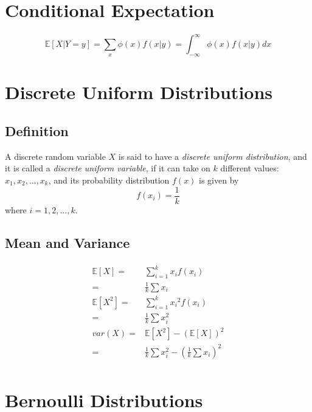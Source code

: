 \documentclass[titlepage]{article}
\begin{document}
    \section{Conditional Expectation}
        \paragraph{
            $$\mathbb{E}[X|Y=y]=\sum_x\phi(x)f(x|y)=\int_{-\infty}^\infty \phi(x)f(x|y)dx$$
        }
    \section{Discrete Uniform Distributions}
        \subsection*{Definition}
            A discrete random variable $X$ is said to have a \textit{discrete uniform distribution}, and it is called a \textit{discrete uniform variable}, if it can take on $k$ different values: $x_1,x_2,...,x_k$, and its probability distribution $f(x)$ is given by
            $$f(x_i)=\frac{1}{k}$$
            where $i=1,2,...,k$.

        \subsection*{Mean and Variance}
            \paragraph{
                \begin{equation*}
                    \begin{split}
                        \mathbb{E}[X]=&\sum_{i=1}^k x_if(x_i)\\
                        =&\frac{1}{k}\sum x_i\\
                        \mathbb{E}[X^2]=&\sum_{i=1}^k {x_i}^2f(x_i)\\
                        =&\frac{1}{k}\sum x_i^2\\
                        var(X)=&\mathbb{E}[X^2]-(\mathbb{E}[X])^2\\
                        =&\frac{1}{k}\sum x_i^2-(\frac{1}{k}\sum x_i)^2\\
                    \end{split}
                \end{equation*}
            }

    \section{Bernoulli Distributions}
\end{document}
